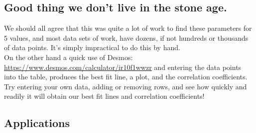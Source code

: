 \subsection{Good thing we don't live in the stone age.}

We should all agree that this was quite a lot of work to find these parameters for 5 values, and most data sets of work, have dozens, if not hundreds or thousands of data points.  It's simply impractical to do this by hand.\\

On the other hand a quick use of Desmos: \url{https://www.desmos.com/calculator/ir10f1wwzr} and entering the data points into the table, produces the best fit line, a plot, and the correlation coefficients.\\

Try entering your own data, adding or removing rows, and see how quickly and readily it will obtain our best fit lines and correlation coefficients!



\subsection{Applications}

